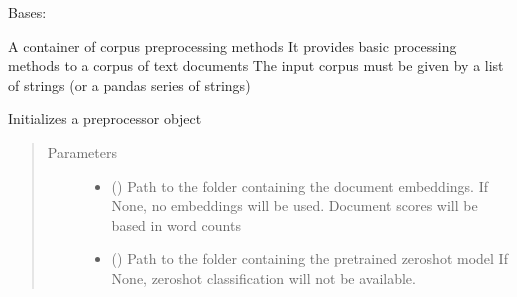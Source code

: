 \documentclass[letterpaper,10pt,english]{sphinxmanual}
\begin{document}
\begin{fulllineitems}
\label{\detokenize{dc_preprocessor:src.domain_classifier.preprocessor.CorpusProcessor}}
\sphinxAtStartPar
Bases: 

\sphinxAtStartPar
A container of corpus preprocessing methods
It provides basic processing methods to a corpus of text documents
The input corpus must be given by a list of strings (or a pandas series
of strings)

\begin{fulllineitems}
\label{\detokenize{dc_preprocessor:src.domain_classifier.preprocessor.CorpusProcessor.__init__}}
\sphinxAtStartPar
Initializes a preprocessor object
\begin{quote}\begin{description}
\item[{Parameters}] \leavevmode\begin{itemize}
\item {} 
\sphinxAtStartPar
{} () \textendash{} Path to the folder containing the document embeddings.
If None, no embeddings will be used. Document scores will be based
in word counts

\item {} 
\sphinxAtStartPar
{} () \textendash{} Path to the folder containing the pretrained zero\sphinxhyphen{}shot model
If None, zero\sphinxhyphen{}shot classification will not be available.

\end{itemize}

\end{description}\end{quote}


\end{fulllineitems}
\end{fulllineitems}
\end{document}
